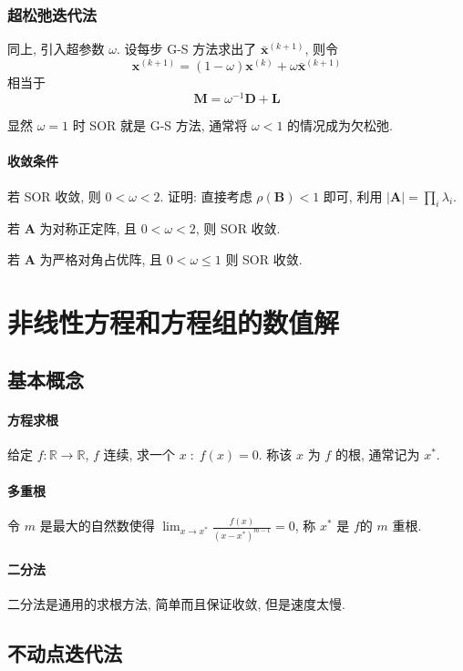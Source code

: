 \documentclass{ctexart}
\newcommand{\Rset}{\mathbb{R}}
\begin{document}
\subsubsection{超松弛迭代法}
    同上, 引入超参数 $\omega$. 设每步 G-S 方法求出了 $\bar{\mathbf{x}}^{(k+1)}$, 则令 \[
        \mathbf{x}^{(k+1)} = (1 - \omega) \mathbf{x}^{(k)} + \omega \bar{\mathbf{x}}^{(k+1)}\]
    相当于 \[
        \mathbf{M} = \omega^{-1} \mathbf{D} + \mathbf{L} \]
    \par
    显然 $\omega = 1$ 时 SOR 就是 G-S 方法, 通常将 $\omega < 1$ 的情况成为欠松弛.\par
\paragraph{收敛条件}
    若 SOR 收敛, 则 $0 < \omega < 2$. 证明: 直接考虑 $\rho(\mathbf{B}) < 1$ 即可, 利用 $|\mathbf{A}| = \prod_i \lambda_i$.\par
    若 $\mathbf{A}$ 为对称正定阵, 且 $0 < \omega < 2$, 则 SOR 收敛.\par
    若 $\mathbf{A}$ 为严格对角占优阵, 且 $0 < \omega \le 1$ 则 SOR 收敛.

\section{非线性方程和方程组的数值解}
\subsection{基本概念}
\paragraph{方程求根}
    给定 $f: \Rset \to \Rset$, $f$ 连续, 求一个 $x\;:\; f(x) = 0$.
    称该 $x$ 为 $f$ 的根, 通常记为 $x^*$.
\paragraph{多重根}
    令 $m$ 是最大的自然数使得 $\lim_{x \to x^*} \frac{f(x)}{(x-x^*)^{m-1}} = 0$,
    称 $x^*$ 是 $f$的 $m$ 重根.
\paragraph{二分法}
    二分法是通用的求根方法, 简单而且保证收敛, 但是速度太慢.

\subsection{不动点迭代法}
\end{document}

